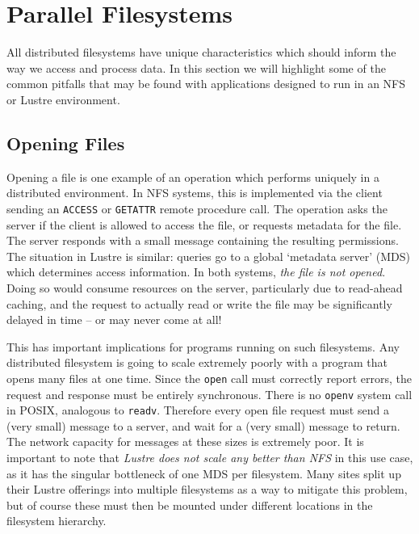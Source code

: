 \section{Parallel Filesystems}\label{sec:parallel_fs}

All distributed filesystems have unique characteristics which should
inform the way we access and process data.  In this section we
will highlight some of the common pitfalls that may be found with
applications designed to run in an NFS or Lustre environment.

\subsection{Opening Files}

Opening a file is one example of an operation which performs uniquely
in a distributed environment.  In NFS systems, this is implemented
via the client sending an \verb!ACCESS! or \verb!GETATTR! remote
procedure call.  The operation asks the server if the client is allowed
to access the file, or requests metadata for the file.  The server
responds with a small message containing the resulting permissions.
The situation in Lustre is similar: queries go to a global `metadata
server' (MDS) which determines access information.  In both systems,
\emph{the file is not opened}.  Doing so would consume resources on
the server, particularly due to read-ahead caching, and the request to
actually read or write the file may be significantly delayed in time --
or may never come at all!

%

This has important implications for programs running on such
filesystems.  Any distributed filesystem is going to scale extremely
poorly with a program that opens many files at one time.  Since the
\verb!open! call must correctly report errors, the request and response
must be entirely synchronous.  There is no \verb!openv! system call in
POSIX, analogous to \verb!readv!.  Therefore every open file request
must send a (very small) message to a server, and wait for a (very
small) message to return.  The network capacity for messages at these
sizes is extremely poor.  It is important to note that \emph{Lustre
does not scale any better than NFS} in this use case, as it has the
singular bottleneck of one MDS per filesystem.  Many sites split up
their Lustre offerings into multiple filesystems as a way to mitigate
this problem, but of course these must then be mounted under different
locations in the filesystem hierarchy.

